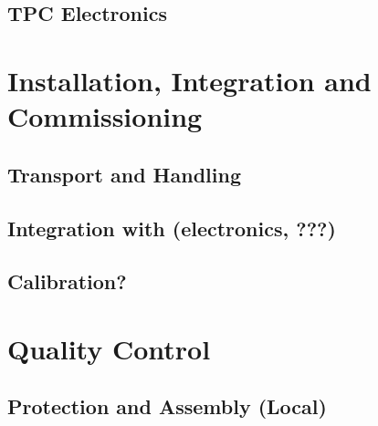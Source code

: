 
\subsection{TPC Electronics}
\label{sec:fddp-daq-intfc-elec}


\subsection{}
\label{sec:fddp-daq-intfc-?}


\section{Installation, Integration and Commissioning}
\label{sec:fddp-daq-install}

\subsection{Transport and Handling}
\label{sec:fddp-daq-install-transport}


\subsection{Integration with (electronics, ???)}
\label{sec:fddp-daq-install-pd-???}


\subsection{Calibration?}
\label{sec:fddp-daq-install-calib}



\section{Quality Control}
\label{sec:fddp-daq-qc}

\subsection{Protection and Assembly (Local)}
\label{sec:fddp-daq-qc-local}


